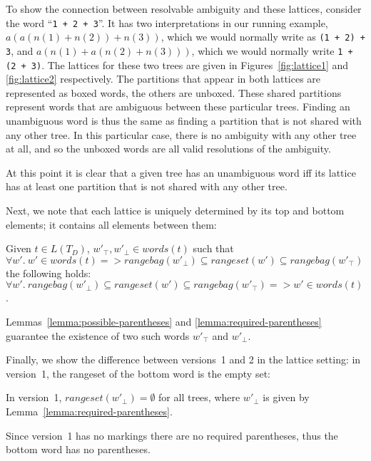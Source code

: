 \documentclass[acmsmall,review,anonymous]{acmart}\settopmatter{printfolios=true,printccs=false,printacmref=false}
\newcommand{\words}{\mathit{words}} %
\newcommand{\alt}{\mathit{alt}} %
\newcommand{\rangebag}{\mathit{rangebag}} %
\newcommand{\rangeset}{\mathit{rangeset}} %
\begin{document}
To show the connection between resolvable ambiguity and these lattices, consider the word ``\verb|1 + 2 + 3|''. It has two interpretations in our running example, $a(a(n(1)+n(2))+n(3))$, which we would normally write as \verb|(1 + 2) + 3|, and $a(n(1)+a(n(2)+n(3)))$, which we would normally write \verb|1 + (2 + 3)|. The lattices for these two trees are given in Figures~\ref{fig:lattice1} and \ref{fig:lattice2} respectively. The partitions that appear in both lattices are represented as boxed words, the others are unboxed. These shared partitions represent words that are ambiguous between these particular trees. Finding an unambiguous word is thus the same as finding a partition that is not shared with any other tree. In this particular case, there is no ambiguity with any other tree at all, and so the unboxed words are all valid resolutions of the ambiguity.

At this point it is clear that a given tree has an unambiguous word iff its lattice has at least one partition that is not shared with any other tree.

Next, we note that each lattice is uniquely determined by its top and bottom elements; it contains all elements between them:

\begin{lemma}
  Given $t \in L(T_D)$, $w'_\top, w'_\bot \in \words(t)$ such that $\forall w'.\ w' \in \words(t) => \rangebag(w'_\bot) \subseteq \rangeset(w') \subseteq \rangebag(w'_\top)$ the following holds:\\
  $\forall w'.\ \rangebag(w'_\bot) \subseteq \rangeset(w') \subseteq \rangebag(w'_\top) => w' \in \words(t)$. \label{lemma:top-bottom-determine}
\end{lemma}

\noindent Lemmas~\ref{lemma:possible-parentheses} and \ref{lemma:required-parentheses} guarantee the existence of two such words $w'_\top$ and $w'_\bot$.

Finally, we show the difference between versions~1 and 2 in the lattice setting: in version~1, the rangeset of the bottom word is the empty set:

\begin{lemma}
  In version~1, $rangeset(w'_\bot) = \emptyset$ for all trees, where $w'_\bot$ is given by Lemma~\ref{lemma:required-parentheses}. \label{lemma:version1-bot}
\end{lemma}

\noindent Since version~1 has no markings there are no required parentheses, thus the bottom word has no parentheses.
\end{document}
